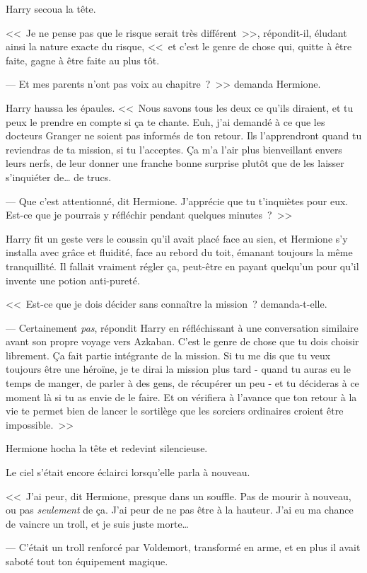 Harry secoua la tête.

<<~Je ne pense pas que le risque serait très différent~>>, répondit-il, éludant ainsi la nature exacte du risque, <<~et c'est le genre de chose qui, quitte à être faite, gagne à être faite au plus tôt.

--- Et mes parents n'ont pas voix au chapitre~?~>> demanda Hermione.

Harry haussa les épaules. <<~Nous savons tous les deux ce qu'ils diraient, et tu peux le prendre en compte si ça te chante. Euh, j'ai demandé à ce que les docteurs Granger ne soient pas informés de ton retour. Ils l'apprendront quand tu reviendras de ta mission, si tu l'acceptes. Ça m'a l'air plus bienveillant envers leurs nerfs, de leur donner une franche bonne surprise plutôt que de les laisser s'inquiéter de… de trucs.

--- Que c'est attentionné, dit Hermione. J'apprécie que tu t'inquiètes pour eux. Est-ce que je pourrais y réfléchir pendant quelques minutes~?~>>

Harry fit un geste vers le coussin qu'il avait placé face au sien, et Hermione s'y installa avec grâce et fluidité, face au rebord du toit, émanant toujours la même tranquillité. Il fallait vraiment régler ça, peut-être en payant quelqu'un pour qu'il invente une potion anti-pureté.

<<~Est-ce que je dois décider sans connaître la mission~? demanda-t-elle.

--- Certainement \emph{pas}, répondit Harry en réfléchissant à une conversation similaire avant son propre voyage vers Azkaban. C'est le genre de chose que tu dois choisir librement. Ça fait partie intégrante de la mission. Si tu me dis que tu veux toujours être une héroïne, je te dirai la mission plus tard - quand tu auras eu le temps de manger, de parler à des gens, de récupérer un peu - et tu décideras à ce moment là si tu as envie de le faire. Et on vérifiera à l'avance que ton retour à la vie te permet bien de lancer le sortilège que les sorciers ordinaires croient être impossible.~>>

Hermione hocha la tête et redevint silencieuse.

Le ciel s'était encore éclairci lorsqu'elle parla à nouveau.

<<~J'ai peur, dit Hermione, presque dans un souffle. Pas de mourir à nouveau, ou pas \emph{seulement} de ça. J'ai peur de ne pas être à la hauteur. J'ai eu ma chance de vaincre un troll, et je suis juste morte…

--- C'était un troll renforcé par Voldemort, transformé en arme, et en plus il avait saboté tout ton équipement magique.

